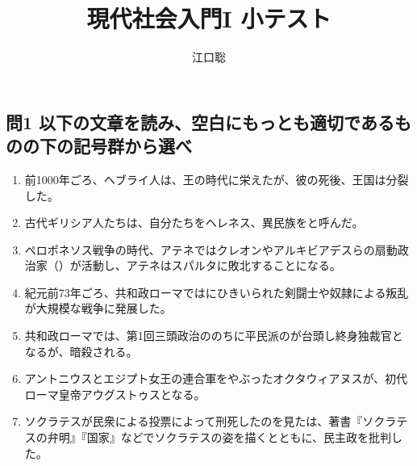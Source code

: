 \documentclass[uplatex,dvipdfmx]{jsarticle}
\author{江口聡}
\title{現代社会入門I 小テスト}
\begin{document}
\maketitle

\subsection*{問1 以下の文章を読み、空白にもっとも適切であるものの下の記号群から選べ }

\begin{enumerate}



\item  前1000年ごろ、ヘブライ人は、王の時代に栄えたが、彼の死後、王国は分裂した。


\item 古代ギリシア人たちは、自分たちをヘレネス、異民族をと呼んだ。

  



  
\item ペロポネソス戦争の時代、アテネではクレオンやアルキビアデスらの扇動政治家（）が活動し、アテネはスパルタに敗北することになる。
  

\item 紀元前73年ごろ、共和政ローマではにひきいられた剣闘士や奴隷による叛乱が大規模な戦争に発展した。

  
\item 共和政ローマでは、第1回三頭政治ののちに平民派のが台頭し終身独裁官となるが、暗殺される。

  
 \item アントニウスとエジプト女王の連合軍をやぶったオクタウィアヌスが、初代ローマ皇帝アウグストゥスとなる。
  

  
\item ソクラテスが民衆による投票によって刑死したのを見たは、著書『ソクラテスの弁明』『国家』などでソクラテスの姿を描くとともに、民主政を批判した。
  

\end{enumerate}
\end{document}
